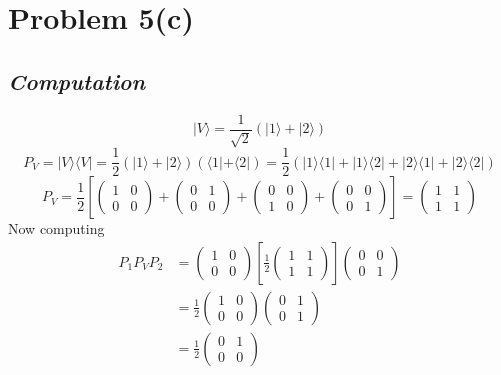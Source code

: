 \documentclass[letter]{article}
\begin{document}
\section*{Problem 5(c)} 
\subsection*{\emph{Computation} }
\[
| V \rangle = \frac{1}{\sqrt{2} } ( | 1 \rangle + | 2 \rangle )
\]
\[
P_V = | V \rangle \langle V | = 
\frac{1}{2} (
| 1 \rangle + | 2 \rangle 
)
(\langle 1 | + \langle 2 | ) = 
\frac{1}{2} 
\left(
| 1 \rangle \langle 1 | +  
| 1 \rangle \langle 2 | + 
| 2 \rangle \langle 1 | + 
| 2 \rangle \langle 2 | 
\right)
\]  
\[
P_V = 
\frac{1}{2 }
\left[
	\begin{pmatrix} 1&0\\0&0 \end{pmatrix}  + 
	\begin{pmatrix} 0&1\\0&0 \end{pmatrix}  + 
	\begin{pmatrix} 0&0\\1&0 \end{pmatrix}  + 
	\begin{pmatrix} 0&0\\0&1 \end{pmatrix}  
\right]
=
	\begin{pmatrix} 1&1\\1&1 \end{pmatrix} 
\]
Now computing 
\begin{align*}
	P_1 P_V P_2 &= 
\begin{pmatrix} 1 & 0 \\ 0 & 0 \end{pmatrix} 
\left[\frac{1}{2} 
\begin{pmatrix} 1&1\\1&1 \end{pmatrix} \right] 
\begin{pmatrix} 0&0\\0&1 \end{pmatrix}  \\ 
&= \frac{1}{2}  
\begin{pmatrix} 1 & 0 \\ 0 & 0 \end{pmatrix}  \begin{pmatrix} 0&1\\0&1 \end{pmatrix}  \\ &=
\frac{1}{2}\begin{pmatrix} 0&1\\0&0 \end{pmatrix} 
\end{align*}
\end{document}
